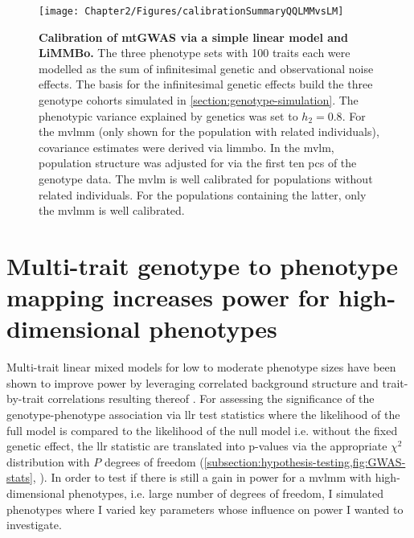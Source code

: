 %
\begin{figure}[h!]
	\centering	
	\texttt{[image: Chapter2/Figures/calibrationSummaryQQLMMvsLM]}\\
	\caption[\textbf{Calibration of mtGWAS via a simple linear model and a linear mixed model. }]{\textbf{Calibration of mtGWAS via a simple linear model and LiMMBo.} The three phenotype sets with \num{100} traits each were modelled as the sum of infinitesimal genetic and observational noise effects. The basis for the infinitesimal genetic effects build the three genotype cohorts simulated in \cref{section:genotype-simulation}. The phenotypic variance explained by genetics was set to \(h_2=0.8\). For the \gls{mvlmm} (only shown for the population with related individuals), covariance estimates were derived via \gls{limmbo}. In the \gls{mvlm}, population structure was adjusted for via the first ten \glspl{pc} of the genotype data. The \gls{mvlm} is well calibrated for populations without related individuals. For the populations containing the latter, only the \gls{mvlmm} is well calibrated. }
	  \label{fig:calibration-LM}%
\end{figure}

\section{Multi-trait genotype to phenotype mapping increases power for high-dimensional phenotypes}
\label{section:power-limmbo}

Multi-trait linear mixed models for low to moderate phenotype sizes have been shown to improve power by leveraging correlated background structure and trait-by-trait correlations resulting thereof \citep{Casale2015}. For assessing the significance of the genotype-phenotype association via \gls{llr} test statistics where the likelihood of the full model is compared to the likelihood of the null model i.e. without the fixed genetic effect, the \gls{llr} statistic are translated into p-values via the appropriate \(\chi^2\) distribution with \(P\) degrees of freedom (\cref{subsection:hypothesis-testing,fig:GWAS-stats}, \citep{Wilks1938}).  In order to test if there is still a gain in power for a \gls{mvlmm} with high-dimensional phenotypes, i.e. large number of degrees of freedom, I simulated phenotypes where I varied key parameters whose influence on power I wanted to investigate. 


